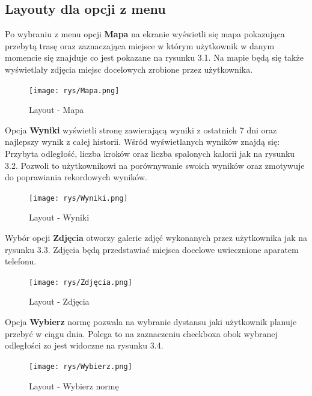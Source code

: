 \subsection{Layouty dla opcji z menu}
Po wybraniu z menu opcji \textbf{Mapa} na ekranie wyświetli się mapa pokazująca przebytą trasę oraz zaznaczająca miejsce w którym użytkownik w danym momencie się znajduje co jest pokazane na rysunku 3.1.
Na mapie będą się także wyświetlały zdjęcia miejsc docelowych zrobione przez użytkownika.
\begin{figure}[!htb]
	\begin{center}
		\texttt{[image: rys/Mapa.png]}
		\caption{Layout - Mapa}
		\label{rys:rysunek003}
	\end{center}
\end{figure}
\newline Opcja \textbf{Wyniki} wyświetli stronę zawierającą wyniki z ostatnich 7 dni oraz najlepszy wynik z całej historii. Wśród wyświetlanych wyników znajdą się: Przybyta odległość, liczba kroków oraz liczba spalonych kalorii jak na rysunku 3.2. Pozwoli to użytkownikowi na porównywanie swoich wyników oraz zmotywuje do poprawiania rekordowych wyników.
\begin{figure}[!htb]
	\begin{center}
		\texttt{[image: rys/Wyniki.png]}
		\caption{Layout - Wyniki}
		\label{rys:rysunek004}
	\end{center}
\end{figure}
\newline Wybór opcji \textbf{Zdjęcia} otworzy galerie zdjęć wykonanych przez użytkownika jak na rysunku 3.3. Zdjęcia będą przedstawiać miejsca docelowe uwiecznione aparatem telefonu.
\begin{figure}[!htb]
	\begin{center}
		\texttt{[image: rys/Zdjęcia.png]}
		\caption{Layout - Zdjęcia}
		\label{rys:rysunek005}
	\end{center}
\end{figure}
\newline
\newline Opcja \textbf{Wybierz} normę pozwala na wybranie dystansu jaki użytkownik planuje przebyć w ciągu dnia. Polega to na zaznaczeniu checkboxa obok wybranej odległości zo jest widoczne na rysunku 3.4.
\begin{figure}[!htb]
	\begin{center}
		\texttt{[image: rys/Wybierz.png]}
		\caption{Layout - Wybierz normę}
		\label{rys:rysunek006}
	\end{center}
\end{figure}
 

